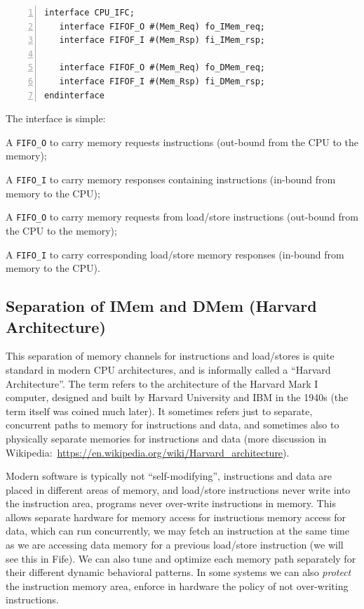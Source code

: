 \begin{Verbatim}[frame=single, numbers=left]
interface CPU_IFC;
   interface FIFOF_O #(Mem_Req) fo_IMem_req;
   interface FIFOF_I #(Mem_Rsp) fi_IMem_rsp;

   interface FIFOF_O #(Mem_Req) fo_DMem_req;
   interface FIFOF_I #(Mem_Rsp) fi_DMem_rsp;
endinterface
\end{Verbatim}

The interface is simple:

\begin{tightlist}

\item A \verb|FIFO_O| to carry memory requests instructions (out-bound
from the CPU to the memory);

\item A \verb|FIFO_I| to carry memory responses containing
instructions (in-bound from memory to the CPU);

\item A \verb|FIFO_O| to carry memory requests from load/store
instructions (out-bound from the CPU to the memory);

\item A \verb|FIFO_I| to carry corresponding load/store memory
responses (in-bound from memory to the CPU).

\end{tightlist}


\subsection{Separation of IMem and DMem (Harvard Architecture)}


This separation of memory channels for instructions and load/stores is
quite standard in modern CPU architectures, and is informally called a
``Harvard Architecture''.  The term refers to the architecture of the
Harvard Mark I computer, designed and built by Harvard University and
IBM in the 1940s (the term itself was coined much later).  It
sometimes refers just to separate, concurrent paths to memory for
instructions and data, and sometimes also to physically separate
memories for instructions and data (more discussion in
Wikipedia:~\url{https://en.wikipedia.org/wiki/Harvard_architecture}).

Modern software is typically not ``self-modifying'', {\ie}
instructions and data are placed in different areas of memory, and
load/store instructions never write into the instruction area, {\ie}
programs never over-write instructions in memory.  This allows
separate hardware for memory access for instructions {\vs} memory
access for data, which can run concurrently, {\ie} we may fetch an
instruction at the same time as we are accessing data memory for a
previous load/store instruction (we will see this in Fife).  We can
also tune and optimize each memory path separately for their different
dynamic behavioral patterns.  In some systems we can also
\emph{protect} the instruction memory area, {\ie} enforce in hardware
the policy of not over-writing instructions.

